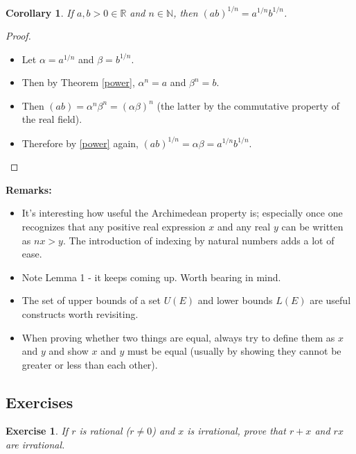 \documentclass[12pt]{article}
\newtheorem{corollary}{Corollary}[theorem]
\newtheorem{exercise}{Exercise}[section]
\newcommand{\R}{\mathbb{R}}
\newcommand{\N}{\mathbb{N}}
\begin{document}
\begin{corollary}
    
    If $a, b > 0 \in \R$ and $n \in \N$, then $(ab)^{1/n} = a^{1/n}b^{1/n}$.

\end{corollary}

\begin{proof}
    
    \begin{itemize}
        \item Let $\alpha = a^{1/n}$ and $\beta = b^{1/n}$.
        \item Then by Theorem \ref{power}, $\alpha^n = a$ and $\beta^n = b$.
        \item Then $(ab) = \alpha^n \beta^n = (\alpha \beta)^n$ (the latter by the commutative property of the real field).
        \item Therefore by \ref{power} again, $(ab)^{1/n} = \alpha \beta = a^{1/n} b^{1/n}$.
    \end{itemize}
      

\end{proof}

\textbf{Remarks:}

\begin{itemize}
    \item It's interesting how useful the Archimedean property is; especially once one recognizes that any positive real expression $x$ and any real $y$ can be written as $nx > y$. The introduction of indexing by natural numbers adds a lot of ease.
    \item Note Lemma 1 - it keeps coming up. Worth bearing in mind.
    \item The set of upper bounds of a set $U(E)$ and lower bounds $L(E)$ are useful constructs worth revisiting.
    \item When proving whether two things are equal, always try to define them as $x$ and $y$ and show $x$ and $y$ must be equal (usually by showing they cannot be greater or less than each other).
\end{itemize}

\subsection{Exercises}

\begin{exercise}
    If $r$ is rational ($r \neq 0$) and $x$ is irrational, prove that $r+x$ and $rx$ are irrational.
\end{exercise}
\end{document}
